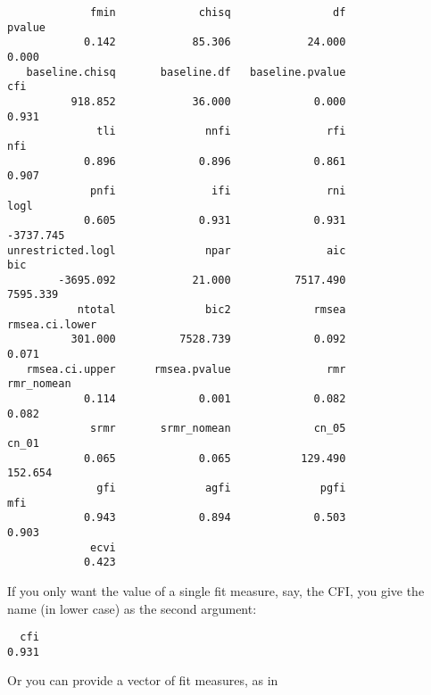 \begin{verbatim}
             fmin             chisq                df            pvalue 
            0.142            85.306            24.000             0.000 
   baseline.chisq       baseline.df   baseline.pvalue               cfi 
          918.852            36.000             0.000             0.931 
              tli              nnfi               rfi               nfi 
            0.896             0.896             0.861             0.907 
             pnfi               ifi               rni              logl 
            0.605             0.931             0.931         -3737.745 
unrestricted.logl              npar               aic               bic 
        -3695.092            21.000          7517.490          7595.339 
           ntotal              bic2             rmsea    rmsea.ci.lower 
          301.000          7528.739             0.092             0.071 
   rmsea.ci.upper      rmsea.pvalue               rmr        rmr_nomean 
            0.114             0.001             0.082             0.082 
             srmr       srmr_nomean             cn_05             cn_01 
            0.065             0.065           129.490           152.654 
              gfi              agfi              pgfi               mfi 
            0.943             0.894             0.503             0.903 
             ecvi 
            0.423 
\end{verbatim}

If you only want the value of a single fit measure, say, the CFI, you
give the name (in lower case) as the second argument:

\begin{Shaded}
\begin{Highlighting}[]
\StringTok{ } 
\NormalTok{)}
\end{Highlighting}
\end{Shaded}

\begin{verbatim}
  cfi 
0.931 
\end{verbatim}

Or you can provide a vector of fit measures, as in

\begin{Shaded}
\begin{Highlighting}[]
\NormalTok{(}\NormalTok{, }\NormalTok{, }\NormalTok{))}
\end{Highlighting}
\end{Shaded}

